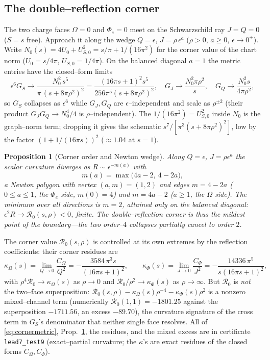 \documentclass[11pt]{article}
\newtheorem{proposition}[theorem]{Proposition}
\newcommand{\Rc}{\mathcal R_0}
\begin{document}
\subsection{The double--reflection corner}
\label{sec:corner}

The two charge faces $\Omega=0$ and $\Phi_e=0$ meet on the Schwarzschild ray $J=Q=0$
($S=s$ free). Approach it along the wedge $Q=\epsilon$, $J=\rho\,\epsilon^{a}$
($\rho>0$, $a\ge0$, $\epsilon\to0^+$). Write $N_0(s)=4U_0+U_{S,0}^2=s/\pi+1/(16\pi^2)$ for the
corner value of the chart norm ($U_0=s/4\pi$, $U_{S,0}=1/4\pi$). On the balanced diagonal
$a=1$ the metric entries have the closed--form limits
\begin{equation}
\epsilon^6 G_S\to \frac{N_0^2\,s^5}{\pi\,(s+8\pi\rho^2)^2}
=\frac{(16\pi s+1)^2 s^5}{256\pi^5(s+8\pi\rho^2)^2},\quad
G_J\to \frac{N_0^2\pi\rho^2}{s},\quad
G_Q\to \frac{N_0^2 s}{4\pi\rho^2},
\label{eq:cornermetric}
\end{equation}
so $G_S$ collapses as $\epsilon^{6}$ while $G_J,G_Q$ are $\epsilon$--independent and scale as
$\rho^{\pm2}$ (their product $G_JG_Q\to N_0^4/4$ is $\rho$--independent). The
$1/(16\pi^2)=U_{S,0}^2$ inside $N_0$ is the graph--norm term; dropping it gives the schematic
$s^7/[\pi^3(s+8\pi\rho^2)^2]$, low by the factor $(1+1/(16\pi s))^2$
($\approx1.04$ at $s=1$).

\begin{proposition}[Corner order and Newton wedge]
\label{prop:corner}
Along $Q=\epsilon$, $J=\rho\epsilon^{a}$ the scalar curvature diverges as
$R\sim\epsilon^{-m(a)}$ with
\[
m(a)=\max\bigl(4a-2,\ 4-2a\bigr),
\]
a Newton polygon with vertex $(a,m)=(1,2)$ and edges $m=4-2a$ ($0\le a\le1$, the $\Phi_e$
side, $m(0)=4$) and $m=4a-2$ ($a\ge1$, the $\Omega$ side). The minimum over all directions is
$m=2$, attained only on the balanced diagonal: $\epsilon^2R\to\Rc(s,\rho)<0$, finite. The
double--reflection corner is thus the mildest point of the boundary---the two order--$4$
collapses partially cancel to order $2$.
\end{proposition}

The corner value $\Rc(s,\rho)$ is controlled at its own extremes by the reflection
coefficients: their corner residues are
\[
\kappa_\Omega(s)=\lim_{Q\to0}\frac{C_\Omega}{Q^2}=-\frac{3584\,\pi^3 s}{(16\pi s+1)^2},\qquad
\kappa_\Phi(s)=\lim_{J\to0}\frac{C_\Phi}{J^2}=-\frac{14336\,\pi^5}{s(16\pi s+1)^2},
\]
with $\rho^4\Rc\to\kappa_\Omega(s)$ as $\rho\to0$ and $\Rc/\rho^2\to\kappa_\Phi(s)$ as
$\rho\to\infty$. But $\Rc$ is \emph{not} the two--face superposition:
$\Rc(s,\rho)-\kappa_\Omega(s)\rho^{-4}-\kappa_\Phi(s)\rho^2$ is a nonzero mixed--channel term
(numerically $\Rc(1,1)=-1801.25$ against the superposition $-1711.56$, an excess $-89.70$),
the curvature signature of the cross term in $G_S$'s denominator that neither single face
resolves. All of \eqref{eq:cornermetric}, Prop.~\ref{prop:corner}, the residues, and the mixed
excess are in certificate \texttt{lead7\_test9} (exact--partial curvature; the $\kappa$'s are
exact residues of the closed forms $C_\Omega,C_\Phi$).
\end{document}
